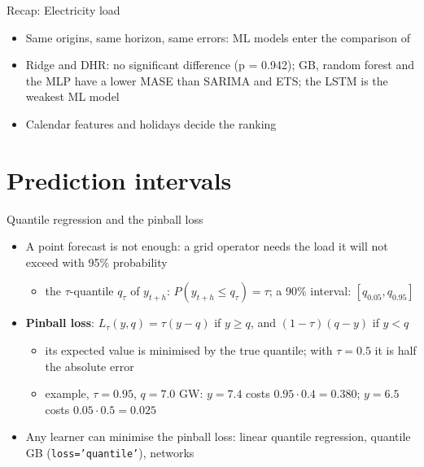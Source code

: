 \begin{frame}{Recap: Electricity load}
\itemsize{\small}
\begin{itemize}
    \item Same origins, same horizon, same errors: ML models enter the comparison of 
    \item Ridge and DHR: no significant difference (p = 0.942); GB, random forest and the MLP have a lower MASE than SARIMA and ETS; the LSTM is the weakest ML model
    \item Calendar features and holidays decide the ranking
\end{itemize}
\end{frame}


\section{Prediction intervals}

\begin{frame}{Quantile regression and the pinball loss}
\itemsize{\footnotesize}
\begin{itemize}
    \item A point forecast is not enough: a grid operator needs the load it will not exceed with 95\% probability
    \begin{itemize}
        \item the $\tau$-quantile $q_\tau$ of $y_{t+h}$: $P(y_{t+h} \le q_\tau) = \tau$; a 90\% interval: $[q_{0.05}, q_{0.95}]$
    \end{itemize}
    \item \textbf{Pinball loss}: $L_\tau(y, q) = \tau(y - q)$ if $y \ge q$, and $(1 - \tau)(q - y)$ if $y < q$ 
    \begin{itemize}
        \item its expected value is minimised by the true quantile; with $\tau = 0.5$ it is half the absolute error
        \item example, $\tau = 0.95$, $q = 7.0$ GW: $y = 7.4$ costs $0.95 \cdot 0.4 = 0.380$; $y = 6.5$ costs $0.05 \cdot 0.5 = 0.025$
    \end{itemize}
    \item Any learner can minimise the pinball loss: linear quantile regression, quantile GB (\texttt{loss='quantile'}), networks
\end{itemize}
\end{frame}

